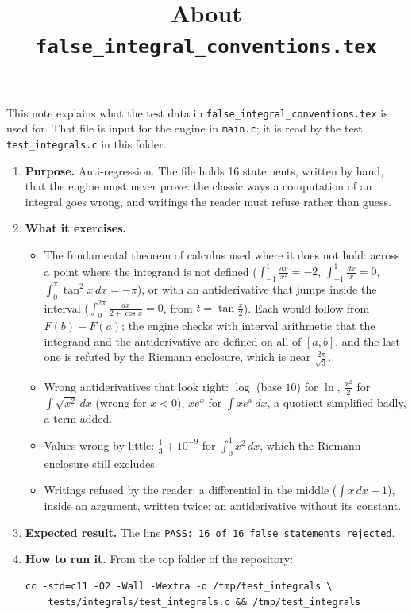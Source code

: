 \documentclass[11pt,a4paper]{article}
\title{About \texttt{false\_integral\_conventions.tex}}
\author{}
\date{}
\begin{document}
\maketitle
This note explains what the test data in \texttt{false\_integral\_conventions.tex} is used for. That file is input for the engine in \texttt{main.c}; it is read by the test \texttt{test\_integrals.c} in this folder.

\begin{enumerate}
\item \textbf{Purpose.} Anti-regression. The file holds 16 statements, written by hand, that the engine must never prove: the classic ways a computation of an integral goes wrong, and writings the reader must refuse rather than guess.

\item \textbf{What it exercises.}
\begin{itemize}
\item The fundamental theorem of calculus used where it does not hold: across a point where the integrand is not defined ($\int_{-1}^{1} \frac{dx}{x^{2}} = -2$, $\int_{-1}^{1} \frac{dx}{x} = 0$, $\int_{0}^{\pi} \tan^{2} x \, dx = -\pi$), or with an antiderivative that jumps inside the interval ($\int_{0}^{2\pi} \frac{dx}{2 + \cos x} = 0$, from $t = \tan\frac{x}{2}$). Each would follow from $F(b) - F(a)$; the engine checks with interval arithmetic that the integrand and the antiderivative are defined on all of $[a, b]$, and the last one is refuted by the Riemann enclosure, which is near $\frac{2\pi}{\sqrt{3}}$.
\item Wrong antiderivatives that look right: $\log$ (base $10$) for $\ln$, $\frac{x^{2}}{2}$ for $\int \sqrt{x^{2}} \, dx$ (wrong for $x < 0$), $x e^{x}$ for $\int x e^{x} \, dx$, a quotient simplified badly, a term added.
\item Values wrong by little: $\frac{1}{3} + 10^{-9}$ for $\int_{0}^{1} x^{2} \, dx$, which the Riemann enclosure still excludes.
\item Writings refused by the reader: a differential in the middle ($\int x \, dx + 1$), inside an argument, written twice; an antiderivative without its constant.
\end{itemize}

\item \textbf{Expected result.} The line \texttt{PASS: 16 of 16 false statements rejected}.

\item \textbf{How to run it.} From the top folder of the repository:
\begin{verbatim}
cc -std=c11 -O2 -Wall -Wextra -o /tmp/test_integrals \
    tests/integrals/test_integrals.c && /tmp/test_integrals
\end{verbatim}
\end{enumerate}
\end{document}

